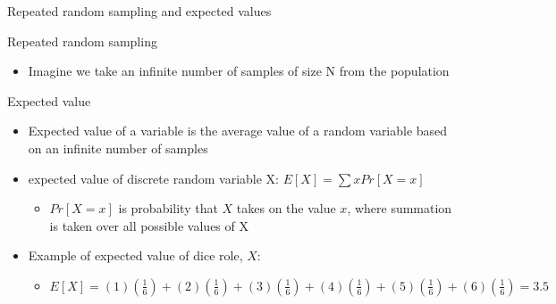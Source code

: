 \begin{frame}{Repeated random sampling and expected values}

	Repeated random sampling
	\begin{itemize}
		\item Imagine we take an infinite number of samples of size N from the population
	\end{itemize}
	\vspace{3mm}
	Expected value
	\begin{itemize}
		\item Expected value of a variable is the average value of a random variable based on an infinite number of samples
		\item expected value of discrete random variable X: $E[X]=\sum xPr[X=x] $
		\begin{itemize}
		\item $ Pr[X=x] $ is probability that $X$ takes on the value $x$, where summation is taken over all possible values of X
		\end{itemize}			
		\item Example of expected value of dice role, $ X $:
		\begin{itemize}
			\item $E[X]=(1)(\frac{1}{6}) +(2)(\frac{1}{6})+(3)(\frac{1}{6})+(4)(\frac{1}{6})+(5)(\frac{1}{6})+(6)(\frac{1}{6})=3.5$
		\end{itemize}

	\end{itemize}	

\end{frame}

